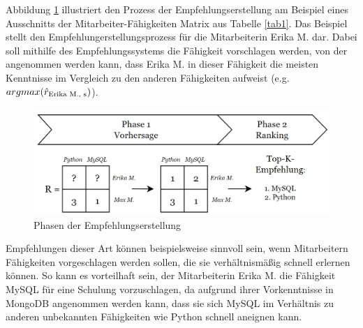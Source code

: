 Abbildung \ref{fig:empfehlungssysteme:recommendation:abb1} illustriert den Prozess der Empfehlungserstellung am Beispiel eines Ausschnitts der Mitarbeiter-Fähigkeiten Matrix aus Tabelle \ref{tab1}.
Das Beispiel stellt den Empfehlungerstellungsprozess für die Mitarbeiterin Erika M. dar.
Dabei soll mithilfe des Empfehlungssystems die Fähigkeit vorschlagen werden, von der angenommen werden kann, dass Erika M. in dieser Fähigkeit die meisten Kenntnisse im Vergleich zu den anderen Fähigkeiten aufweist (e.g. $argmax(\hat{r}_{\textnormal{Erika M., s}})$).

\begin{figure}[H]
    \centering
	\includegraphics[width=1.0\textwidth]{gfx/phasen-empfehlungserstellung.png}
	\caption[Phasen der Empfehlungserstellung]{Phasen der Empfehlungserstellung\\}
	\label{fig:empfehlungssysteme:recommendation:abb1}
\end{figure}

Empfehlungen dieser Art können beispielsweise sinnvoll sein, wenn Mitarbeitern Fähigkeiten vorgeschlagen werden sollen, die sie verhältnismäßig schnell erlernen können.
So kann es vorteilhaft sein, der Mitarbeiterin Erika M. die Fähigkeit MySQL für eine Schulung vorzuschlagen, da aufgrund ihrer Vorkenntnisse in MongoDB angenommen werden kann, dass sie sich My\-SQL im Verhältnis zu anderen unbekannten Fähigkeiten wie Python schnell aneignen kann.

